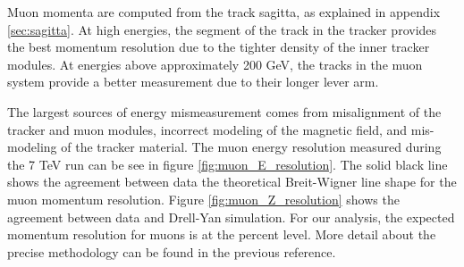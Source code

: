     Muon momenta are computed from the track sagitta, as explained in appendix \ref{sec:sagitta}. At high energies, the segment of the track in the tracker provides the best momentum resolution due to the tighter density of the inner tracker modules. At energies above approximately 200 GeV, the tracks in the muon system provide a better measurement due to their longer lever arm.  

    The largest sources of energy mismeasurement comes from misalignment of the tracker and muon modules, incorrect modeling of the magnetic field, and mis-modeling of the tracker material.\cite[sec. 6]{cms_muons} The muon energy resolution measured during the 7 TeV run can be see in figure \ref{fig:muon_E_resolution}. The solid black line shows the agreement between data the theoretical Breit-Wigner line shape for the muon momentum resolution. Figure \ref{fig:muon_Z_resolution} shows the agreement between data and Drell-Yan simulation. For our analysis, the expected momentum resolution for muons is at the percent level. More detail about the precise methodology can be found in the previous reference.

